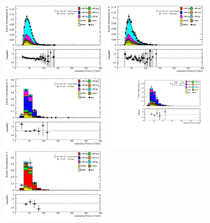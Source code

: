 \begin{figure}[p]
  \centering
  \includegraphics[width=0.48\textwidth]{chapters/chapter5_yybb/images/data_MC_comparison/h_CR_l_0t_nominal_subleadingPhoton_pt.pdf}
  \includegraphics[width=0.48\textwidth]{chapters/chapter5_yybb/images/data_MC_comparison/h_CR_h_0t_nominal_subleadingPhoton_pt.pdf}
  \includegraphics[width=0.48\textwidth]{chapters/chapter5_yybb/images/data_MC_comparison/h_SR_l_1t_nominal_subleadingPhoton_pt.pdf}
  \includegraphics[width=0.48\textwidth]{chapters/chapter5_yybb/images/data_MC_comparison/h_SR_h_1t_nominal_subleadingPhoton_pt.pdf}
  \includegraphics[width=0.48\textwidth]{chapters/chapter5_yybb/images/data_MC_comparison/h_SR_l_2t_nominal_subleadingPhoton_pt.pdf}

\end{figure}
